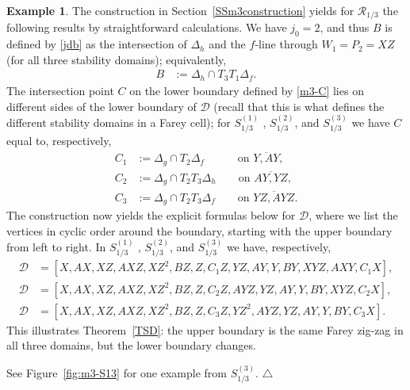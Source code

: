 \documentclass[11pt,reqno,tbtags,a4paper]{amsart}
\numberwithin{equation}{section}
\theoremstyle{plain}%
\theoremstyle{definition}
\newcommand\xqed[1]{%
    \leavevmode\unskip\penalty9999 \hbox{}\nobreak\hfill
    \quad\hbox{#1}}
\newtheorem{exampleqqq}[theorem]{Example}
\newenvironment{example}{\begin{exampleqqq}}
  {\xqed{$\triangle$}\end{exampleqqq}}
\theoremstyle{remark}
\newcommand{\refT}[1]{Theorem~\ref{#1}}
\newcommand{\refSS}[1]{Section~\ref{#1}}
\newcommand{\refFig}[1]{Figure~\ref{#1}}
\newcommand\gD{\Delta}
\newcommand\cD{\mathcal D}
\newcommand\cR{{\mathcal R}}
\newcommand\SA{^{(1)}}
\newcommand\SB{^{(2)}}
\newcommand\SC{^{(3)}}
\newcommand\linje[1]{\overline{#1}}
\newcommand\0{{\boldsymbol 0}}
\newcommand\1{{\boldsymbol 1}}
\begin{document}
\begin{example}
The construction in \refSS{SSm3construction} yields 
for $\cR_{1/3}$
the following results 
by straightforward calculations.
We have $j_0=2$, and thus 
$B$ is defined by \eqref{jdb} as the intersection of $\gD_h$ and
the $f$-line through $W_1=P_2=XZ$
(for all three stability domains);
equivalently, 
\begin{align}\label{emB}
 B&:=\gD_h\cap T_3T_1\gD_f.
\end{align}
The intersection point $C$ on the lower boundary defined by \eqref{m3-C} 
lies on different sides of the lower boundary of $\cD$ 
(recall that this is what defines the different stability domains in a Farey
cell); for
$S_{1/3}\SA$ , $S_{1/3}\SB$, and $S_{1/3}\SC$ we have $C$ equal to, respectively,
\begin{align}\label{emC1}        
C_1&:=\gD_g\cap T_2\gD_f 
\phantom{T_0}\qquad\text{on }\linje{Y,AY},    
\\\label{emC2}
C_2&:=\gD_g\cap T_2T_3\gD_h
\qquad\text{on }\linje{AY,YZ},
\\\label{emC3}
C_3&:=\gD_g\cap T_2T_3\gD_f
\qquad\text{on }\linje{YZ,AYZ}.
\end{align}
The construction now yields the
explicit formulas below for $\cD$,
where we list the vertices in cyclic
order around the boundary, starting
with the upper boundary from left to right.
In $S_{1/3}\SA$ , $S_{1/3}\SB$, and $S_{1/3}\SC$ we have, respectively,
\begin{align}\label{DS13A}
\cD&=[X,AX,XZ,AXZ,XZ^2,BZ,Z,C_1Z,YZ,AY,Y,BY,XYZ,AXY,C_1X],
\\\label{DS13B}
\cD&=[X,AX,XZ,AXZ,XZ^2,BZ,Z,C_2Z,AYZ,YZ,AY,Y,BY,XYZ,C_2X],
\\\label{DS13C}
\cD&=[X,AX,XZ,AXZ,XZ^2,BZ,Z,C_3Z,YZ^2,AYZ,YZ,AY,Y,BY,C_3X].
\end{align}
This illustrates \refT{TSD}:
the upper boundary is the same Farey zig-zag in all three domains,
but the lower boundary changes.

See \refFig{fig:m3-S13} for one example from $S_{1/3}\SC$.
\end{example}
\end{document}
